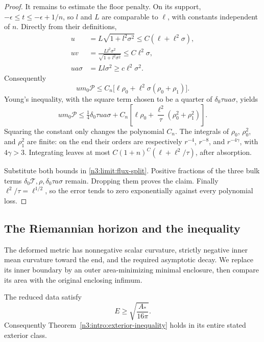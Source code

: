 \begin{proof}
It remains to estimate the floor penalty. On its support,
\(-\epsilon\le t\le-\epsilon+1/n\), so \(l\) and \(L\) are comparable
to \(\ell\), with constants independent of \(n\).
Directly from their definitions,
\[
 \begin{split}
 u&=L\sqrt{1+l^2\sigma^2}
                      \le C(\ell+\ell^2\sigma),\\
 uv&=\frac{Ll^2\sigma^2}{\sqrt{1+l^2\sigma^2}}
                      \le C\ell^2\sigma,\\
 ua\sigma&=Ll\sigma^2\ge c\ell^2\sigma^2 .
 \end{split}
\]
Consequently
\[
 um_0\mathcal P
 \le C_n\bigl[\ell\rho_0+\ell^2\sigma(\rho_0+\rho_1)\bigr].
\]
Young's inequality, with the square term chosen to be a quarter of
\(\delta_0\tau ua\sigma\), yields
\[
 um_0\mathcal P
 \le \tfrac14\delta_0\tau ua\sigma+
 C_n\left[\ell\rho_0+
              \frac{\ell^2}{\tau}(\rho_0^2+\rho_1^2)\right].
\]
Squaring the constant only changes the polynomial
\(C_n\). The integrals of \(\rho_0\), \(\rho_0^2\), and \(\rho_1^2\)
are finite: on the end their orders are respectively \(r^{-4}\),
\(r^{-8}\), and \(r^{-4\gamma}\), with \(4\gamma>3\).
Integrating leaves at most
\(C(1+n)^C(\ell+\ell^2/\tau)\), after absorption.

Substitute both bounds in \eqref{n3:limit:flux-split}.
Positive fractions of the three bulk terms
\(\delta_0\mathcal T,\rho,\delta_0\tau a\sigma\) remain.
Dropping them proves the claim. Finally
\(\ell^2/\tau=\ell^{1/2}\), so the error tends to zero
exponentially against every polynomial loss.
\end{proof}

\subsection{The Riemannian horizon and the inequality}

The deformed metric has nonnegative scalar curvature, strictly negative
inner mean curvature toward the end, and the required asymptotic decay.
We replace its inner boundary by an outer area-minimizing minimal
enclosure, then compare its area with the original enclosing infimum.

\begin{theorem}\label{n3:limit:energy}
The reduced data satisfy
\[
                              E\ge\sqrt{\frac{A_*}{16\pi}}.
\]
Consequently Theorem~\ref{n3:intro:exterior-inequality} holds in its
entire stated exterior class.
\end{theorem}

